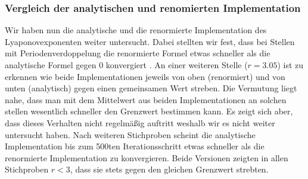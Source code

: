 \documentclass{scrartcl}
\begin{document}
\subsubsection{Vergleich der analytischen und renomierten Implementation}
Wir haben nun die analytische und die renormierte Implementation des Lyaponovexponenten weiter untersucht. Dabei stellten wir fest, dass bei Stellen mit Periodenverdoppelung die renormierte Formel etwas schneller als die analytische Formel gegen 0 konvergiert . An einer weiteren Stelle ($r=3.05$) ist zu erkennen wie beide Implementationen jeweils von oben (renormiert) und von unten (analytisch) gegen einen gemeinsamen Wert streben. 
Die Vermutung liegt nahe, dass man mit dem Mittelwert aus beiden Implementationen an solchen stellen wesentlich schneller den Grenzwert bestimmen kann. Es zeigt sich aber, dass dieses Verhalten nicht regelmäßig auftritt weshalb wir es nicht weiter untersucht haben. Nach weiteren Stichproben scheint die analytische Implementation bis zum 500ten Iterationsschritt etwas schneller als die renormierte Implementation zu konvergieren. Beide Versionen zeigten in allen Stichproben $r<3$, dass sie stets gegen den gleichen Grenzwert strebten.
\end{document}

